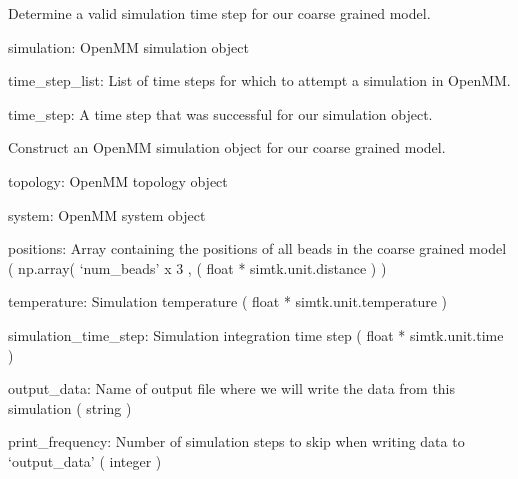 \documentclass[letterpaper,12pt,english,openany,oneside]{sphinxmanual}
\begin{document}

\begin{fulllineitems}
\label{\detokenize{simulation:simulation.tools.get_simulation_time_step}}
Determine a valid simulation time step for our coarse grained model.

simulation: OpenMM simulation object

time\_step\_list: List of time steps for which to attempt a simulation in OpenMM.

time\_step: A time step that was successful for our simulation object.

\end{fulllineitems}


\begin{fulllineitems}
\label{\detokenize{simulation:simulation.tools.minimize_structure}}
Construct an OpenMM simulation object for our coarse grained model.

topology: OpenMM topology object

system: OpenMM system object

positions: Array containing the positions of all beads
in the coarse grained model
( np.array( ‘num\_beads’ x 3 , ( float * simtk.unit.distance ) )

temperature: Simulation temperature ( float * simtk.unit.temperature )

simulation\_time\_step: Simulation integration time step
( float * simtk.unit.time )

output\_data: Name of output file where we will write the data from this
simulation ( string )

print\_frequency: Number of simulation steps to skip when writing data
to ‘output\_data’ ( integer )

\end{fulllineitems}
\end{document}
